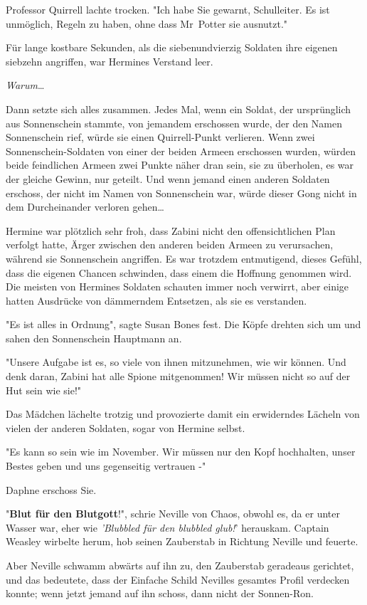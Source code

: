 {Professor Quirrell lachte trocken. "Ich habe Sie gewarnt, Schulleiter. Es ist unmöglich, Regeln zu haben, ohne dass Mr~Potter sie ausnutzt."

Für lange kostbare Sekunden, als die siebenundvierzig Soldaten ihre eigenen siebzehn angriffen, war Hermines Verstand leer.

\emph{Warum}…

Dann setzte sich alles zusammen. Jedes Mal, wenn ein Soldat, der ursprünglich aus Sonnenschein stammte, von jemandem erschossen wurde, der den Namen Sonnenschein rief, würde sie einen Quirrell-Punkt verlieren. Wenn zwei Sonnenschein-Soldaten von einer der beiden Armeen erschossen wurden, würden beide feindlichen Armeen zwei Punkte näher dran sein, sie zu überholen, es war der gleiche Gewinn, nur geteilt. Und wenn jemand einen anderen Soldaten erschoss, der nicht im Namen von Sonnenschein war, würde dieser Gong nicht in dem Durcheinander verloren gehen…

Hermine war plötzlich sehr froh, dass Zabini nicht den offensichtlichen Plan verfolgt hatte, Ärger zwischen den anderen beiden Armeen zu verursachen, während sie Sonnenschein angriffen. Es war trotzdem entmutigend, dieses Gefühl, dass die eigenen Chancen schwinden, dass einem die Hoffnung genommen wird. Die meisten von Hermines Soldaten schauten immer noch verwirrt, aber einige hatten Ausdrücke von dämmerndem Entsetzen, als sie es verstanden.

"Es ist alles in Ordnung", sagte Susan Bones fest. Die Köpfe drehten sich um und sahen den Sonnenschein Hauptmann an.

"Unsere Aufgabe ist es, so viele von ihnen mitzunehmen, wie wir können. Und denk daran, Zabini hat alle Spione mitgenommen! Wir müssen nicht so auf der Hut sein wie sie!"

Das Mädchen lächelte trotzig und provozierte damit ein erwiderndes Lächeln von vielen der anderen Soldaten, sogar von Hermine selbst.

"Es kann so sein wie im November. Wir müssen nur den Kopf hochhalten, unser Bestes geben und uns gegenseitig vertrauen -"

Daphne erschoss Sie.

"\textbf{Blut für den Blutgott}!", schrie Neville von Chaos, obwohl es, da er unter Wasser war, eher wie \emph{'Blubbled für den blubbled glub!}' herauskam. Captain Weasley wirbelte herum, hob seinen Zauberstab in Richtung Neville und feuerte.

Aber Neville schwamm abwärts auf ihn zu, den Zauberstab geradeaus gerichtet, und das bedeutete, dass der Einfache Schild Nevilles gesamtes Profil verdecken konnte; wenn jetzt jemand auf ihn schoss, dann nicht der Sonnen-Ron.

}
